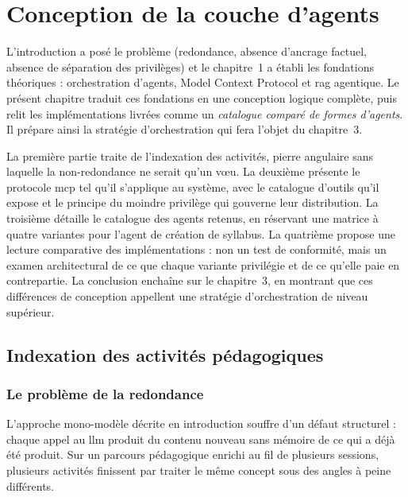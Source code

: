 \chapter{Conception de la couche d'agents}
\label{chap:conception}

\sloppy

L'introduction a posé le problème (redondance, absence d'ancrage factuel,
absence de séparation des privilèges) et le chapitre~1 a établi les fondations
théoriques : orchestration d'agents, Model Context Protocol et \gls{rag}
agentique. Le présent chapitre traduit ces fondations en une conception logique
complète, puis relit les implémentations livrées comme un \emph{catalogue
comparé de formes d'agents}. Il prépare ainsi la stratégie d'orchestration qui
fera l'objet du chapitre~3.

La première partie traite de l'indexation des activités, pierre angulaire sans
laquelle la non-redondance ne serait qu'un v{\oe}u. La deuxième présente le
protocole \gls{mcp} tel qu'il s'applique au système, avec le catalogue d'outils
qu'il expose et le principe du moindre privilège qui gouverne leur
distribution. La troisième détaille le catalogue des agents retenus, en
réservant une matrice à quatre variantes pour l'agent de création de syllabus.
La quatrième propose une lecture comparative des implémentations : non un test
de conformité, mais un examen architectural de ce que chaque variante
privilégie et de ce qu'elle paie en contrepartie. La conclusion enchaîne sur le
chapitre~3, en montrant que ces différences de conception appellent une
stratégie d'orchestration de niveau supérieur.

\section{Indexation des activités pédagogiques}
\label{sec:indexation}

\subsection{Le problème de la redondance}

L'approche mono-modèle décrite en introduction souffre d'un défaut structurel :
chaque appel au \gls{llm} produit du contenu nouveau sans mémoire de ce qui a
déjà été produit. Sur un parcours pédagogique enrichi au fil de plusieurs
sessions, plusieurs activités finissent par traiter le même concept sous des
angles à peine différents.

